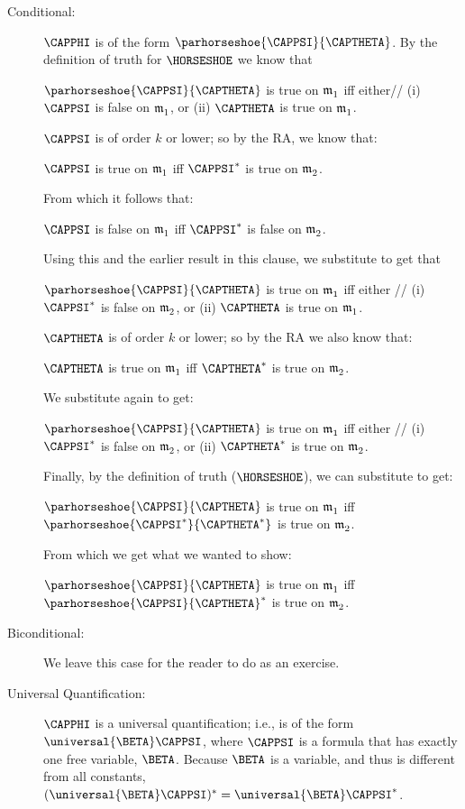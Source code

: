 \begin{PROOF}
\begin{description}
\begin{description}
\item[Conditional:] $\CAPPHI$ is of the form $\parhorseshoe{\CAPPSI}{\CAPTHETA}$. By the definition of truth for $\HORSESHOE$ we know that
\begin{center}
$\parhorseshoe{\CAPPSI}{\CAPTHETA}$ is true on $\mathfrak{m^{\mathrm{}}_{\mathrm{1}}}$
  iff  either//
   (i) $\CAPPSI$ is false on $\mathfrak{m^{\mathrm{}}_{\mathrm{1}}}$, or (ii)
   $\CAPTHETA$ is true on $\mathfrak{m^{\mathrm{}}_{\mathrm{1}}}$.
\end{center}
$\CAPPSI$ is of order $k$ or lower; so by the RA, we know that:
\begin{center}
$\CAPPSI$ is true on $\mathfrak{m^{\mathrm{}}_{\mathrm{1}}}$ iff $\CAPPSI^*$ is true on $\mathfrak{m^{\mathrm{}}_{\mathrm{2}}}$.
\end{center}
From which it follows that:
\begin{center}
$\CAPPSI$ is false on $\mathfrak{m^{\mathrm{}}_{\mathrm{1}}}$ iff $\CAPPSI^*$ is false on $\mathfrak{m^{\mathrm{}}_{\mathrm{2}}}$.
\end{center}
Using this and the earlier result in this clause, we substitute to get that
\begin{center}
$\parhorseshoe{\CAPPSI}{\CAPTHETA}$ is true on $\mathfrak{m^{\mathrm{}}_{\mathrm{1}}}$
  iff  either // 
	  (i) $\CAPPSI^*$ is false on $\mathfrak{m^{\mathrm{}}_{\mathrm{2}}}$,
        or (ii) $\CAPTHETA$ is true on $\mathfrak{m^{\mathrm{}}_{\mathrm{1}}}$.
\end{center}
$\CAPTHETA$ is of order $k$ or lower; so by the RA we also know that:
\begin{center}
$\CAPTHETA$ is true on $\mathfrak{m^{\mathrm{}}_{\mathrm{1}}}$ iff $\CAPTHETA^*$ is true on $\mathfrak{m^{\mathrm{}}_{\mathrm{2}}}$.
\end{center}
We substitute again to get:
\begin{center}
$\parhorseshoe{\CAPPSI}{\CAPTHETA}$ is true on $\mathfrak{m^{\mathrm{}}_{\mathrm{1}}}$
 iff either //
  (i) $\CAPPSI^*$ is false on $\mathfrak{m^{\mathrm{}}_{\mathrm{2}}}$,
 or (ii) $\CAPTHETA^*$ is true on $\mathfrak{m^{\mathrm{}}_{\mathrm{2}}}$.
\end{center}
Finally, by the definition of truth ($\HORSESHOE$), we can substitute to get:
\begin{center}
$\parhorseshoe{\CAPPSI}{\CAPTHETA}$ is true on $\mathfrak{m^{\mathrm{}}_{\mathrm{1}}}$
 iff $\parhorseshoe{\CAPPSI^*}{\CAPTHETA^*}$ is true on $\mathfrak{m^{\mathrm{}}_{\mathrm{2}}}$.
\end{center}
From which we get what we wanted to show:
\begin{center}
$\parhorseshoe{\CAPPSI}{\CAPTHETA}$ is true on $\mathfrak{m^{\mathrm{}}_{\mathrm{1}}}$ iff  $\parhorseshoe{\CAPPSI}{\CAPTHETA}^*$ is true on $\mathfrak{m^{\mathrm{}}_{\mathrm{2}}}$.
\end{center}

\item[Biconditional:] We leave this case for the reader to do as an exercise.

\item[Universal Quantification:] $\CAPPHI$ is a universal quantification; i.e., is of the form $\universal{\BETA}\CAPPSI$, where $\CAPPSI$ is a formula that has exactly one free variable, $\BETA$.  Because $\BETA$ is a variable, and thus is different from all constants, $(\universal{\BETA}\CAPPSI)^*=\universal{\BETA}\CAPPSI^*$.


\end{description}
\end{description}
\end{PROOF}
